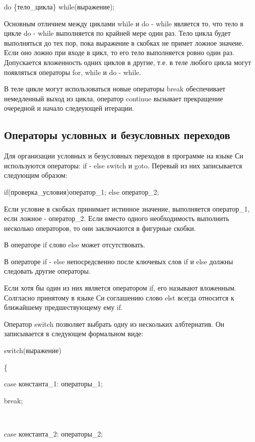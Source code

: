 \documentclass[a4paper, fontsize=10bp]{article} %
\begin{document}
do \{тело\_цикла\} while(выражение);

\noindent Основным отличием между циклами while и do - while является то, что тело в цикле do - while выполняется 
по крайней мере  один раз. Тело цикла будет выполняться до тех пор, пока выражение в скобках не примет
ложное значеие. Если оно ложно при входе в цикл, то его тело выполняется ровно один раз.
Допускается вложенность одних циклов в другие, т.е. в теле любого цикла могут появляться операторы for,
while и do - while.

\noindent В теле цикле могут использоваться новые операторы break обеспечивает
немедленный выход из цикла, оператор continue вызывает прекращение очередной и начало следеующей
итерации.

\subsection*{Операторы условных и безусловных переходов}

\noindent Для организации условных и безусловных переходов в программе на языке Си используются операторы: if -
else switch и goto. Перевый из них записывается следующим образом:

if(проверка\_условия)оператор\_1; else оператор\_2;

\noindent Если условие в скобках принимает истинное значение, выполняется оператор\_1, если ложное - оператор\_2.
Если вместо одного необходимость выполнить несколько операторов, то они заключаются в фигурные скобки.

\noindent В операторе if слово else может отсутствовать.

\noindent В операторе if - else непосредсвенно после ключевых слов if и else должны следовать другие операторы.

\noindent Если хотя бы один из них является оператором if, его называют вложенным. Солгласно принятому в языке Си
соглашению слово elst всегда относится к ближайшему предшествующему ему if.

\noindent Оператор switch позволяет выбрать одну из нескольких албтернатив. Он записывается в следующем
формальном виде:

\noindent   switch(выражение)

\noindent \{

case константа\_1: операторы\_1;

\qquad break;

\ 

case константа\_2: операторы\_2;
\end{document}
